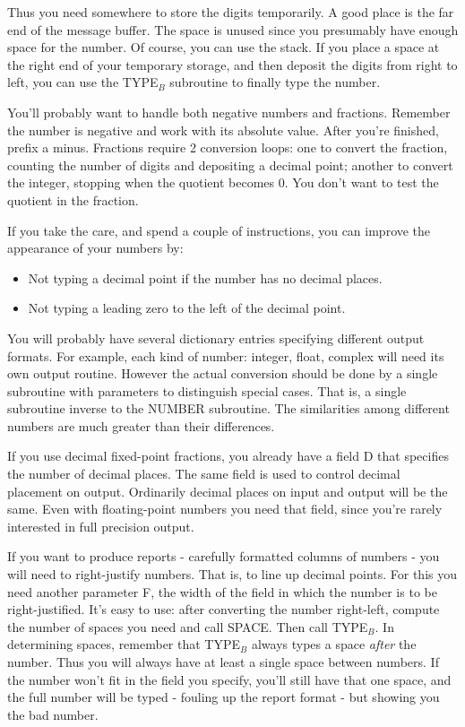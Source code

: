 \documentclass[b5paper, oneside]{book}
\begin{document}
Thus you need somewhere to store the digits temporarily. A good place is the far end of the message buffer. The space is unused since you presumably have enough space for the number. Of course, you can use the stack. If you place a space at the right end of your temporary storage, and then deposit the digits from right to left, you can use the TYPE$_B$ subroutine to finally type the number.

You'll probably want to handle both negative numbers and fractions. Remember the number is negative and work with its absolute value. After you're finished, prefix a minus. Fractions require 2 conversion loops: one to convert the fraction, counting the number of digits and depositing a decimal point; another to convert the integer, stopping when the quotient becomes 0. You don't want to test the quotient in the fraction.

If you take the care, and spend a couple of instructions, you can improve the appearance of your numbers by:\begin{itemize}
   \item Not typing a decimal point if the number has no decimal places.
   \item Not typing a leading zero to the left of the decimal point.\end{itemize}
You will probably have several dictionary entries specifying different output formats. For example, each kind of number: integer, float, complex will need its own output routine.  However the actual conversion should be done by a single subroutine with parameters to distinguish special cases. That is, a single subroutine inverse to the NUMBER subroutine. The similarities among different numbers are much greater than their differences.

If you use decimal fixed-point fractions, you already have a field D that specifies the number of decimal places. The same field is used to control decimal placement on output. Ordinarily decimal places on input and output will be the same. Even with floating-point numbers you need that field, since you're rarely interested in full precision output.

If you want to produce reports - carefully formatted columns of numbers - you will need to right-justify numbers. That is, to line up decimal points. For this you need another parameter F, the width of the field in which the number is to be right-justified. It's easy to use: after converting the number right-left, compute the number of spaces you need and call SPACE. Then call TYPE$_B$. In determining spaces, remember that TYPE$_B$ always types a space {\em after} the number. Thus you will always have at least a single space between numbers. If the number won't fit in the field you specify, you'll still have that one space, and the full number will be typed - fouling up the report format - but showing you the bad number.
\end{document}
